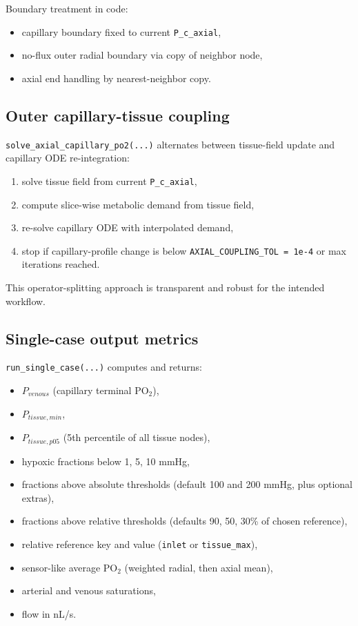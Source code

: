 \documentclass[12pt,a4paper]{article}
\begin{document}
Boundary treatment in code:
\begin{itemize}
    \item capillary boundary fixed to current \texttt{P\_c\_axial},
    \item no-flux outer radial boundary via copy of neighbor node,
    \item axial end handling by nearest-neighbor copy.
\end{itemize}

\subsection{Outer capillary-tissue coupling}
\texttt{solve\_axial\_capillary\_po2(...)} alternates between tissue-field update and capillary ODE re-integration:
\begin{enumerate}
    \item solve tissue field from current \texttt{P\_c\_axial},
    \item compute slice-wise metabolic demand from tissue field,
    \item re-solve capillary ODE with interpolated demand,
    \item stop if capillary-profile change is below \texttt{AXIAL\_COUPLING\_TOL = 1e-4} or max iterations reached.
\end{enumerate}

This operator-splitting approach is transparent and robust for the intended workflow.

\subsection{Single-case output metrics}
\texttt{run\_single\_case(...)} computes and returns:
\begin{itemize}
    \item $P_{venous}$ (capillary terminal PO$_2$),
    \item $P_{tissue,min}$,
    \item $P_{tissue,p05}$ (5th percentile of all tissue nodes),
    \item hypoxic fractions below 1, 5, 10 mmHg,
    \item fractions above absolute thresholds (default 100 and 200 mmHg, plus optional extras),
    \item fractions above relative thresholds (defaults 90, 50, 30\% of chosen reference),
    \item relative reference key and value (\texttt{inlet} or \texttt{tissue\_max}),
    \item sensor-like average PO$_2$ (weighted radial, then axial mean),
    \item arterial and venous saturations,
    \item flow in nL/s.
\end{itemize}
\end{document}
